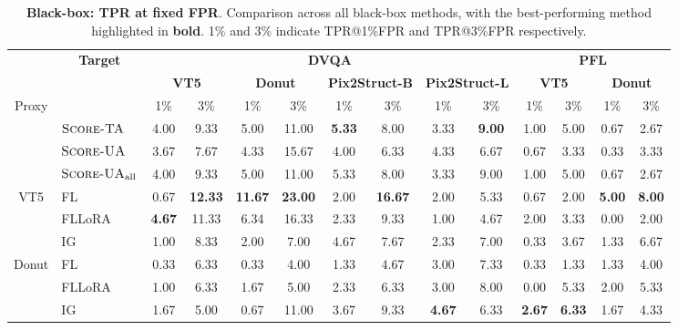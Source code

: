 \begin{table}[t]
\begin{center}
\begin{small}
\begin{adjustbox}{width=1\textwidth}
\small
\begin{tabular}{clcccccccccccc}
\toprule
 & \multicolumn{1}{c}{\multirow{2}{*}{\textbf{Target}}} & \multicolumn{8}{c}{\textbf{DVQA}} & \multicolumn{4}{c}{\textbf{PFL}} \\
\cmidrule(l){3-10}
\cmidrule(l){11-14}
 &  & \multicolumn{2}{c}{\textbf{VT5}} & \multicolumn{2}{c}{\textbf{Donut}} & \multicolumn{2}{c}{\textbf{Pix2Struct-B}} & \multicolumn{2}{c}{\textbf{Pix2Struct-L}} & \multicolumn{2}{c}{\textbf{VT5}} & \multicolumn{2}{c}{\textbf{Donut}} \\
\cmidrule(l){3-4}
\cmidrule(l){5-6}
\cmidrule(l){7-8}
\cmidrule(l){9-10}
\cmidrule(l){11-12}
\cmidrule(l){13-14}
Proxy &  & 1\% & 3\% & 1\% & 3\% & 1\% & 3\% & 1\% & 3\% & 1\% & 3\% & 1\% & 3\%  \\
\midrule
& {$\textsc{Score-TA}$} & 4.00 & 9.33 & 5.00 & 11.00 & \textbf{5.33} & 8.00 & 3.33 & \textbf{9.00} & 1.00 & 5.00 & 0.67 & 2.67 \\
& {$\textsc{Score-UA}$} & 3.67 & 7.67 & 4.33 & 15.67 & 4.00 & 6.33 & 4.33 & 6.67 & 0.67 & 3.33 & 0.33 & 3.33 \\
& {$\textsc{Score-UA}_{\text{all}}$} & 4.00 & 9.33 & 5.00 & 11.00 & 5.33 & 8.00 & 3.33 & 9.00 & 1.00 & 5.00 & 0.67 & 2.67 \\
\midrule
\multirow{3}{*}{VT5} & FL & 0.67 & \textbf{12.33} & \textbf{11.67} & \textbf{23.00} & 2.00 & \textbf{16.67} & 2.00 & 5.33 & 0.67 & 2.00 & \textbf{5.00} & \textbf{8.00} \\
& FLLoRA & \textbf{4.67} & {11.33} & 6.34 & 16.33 & 2.33 & 9.33 & 1.00 & 4.67 & 2.00 & 3.33 & 0.00 & 2.00 \\
& IG & 1.00 & 8.33 & 2.00 & 7.00 & 4.67 & 7.67 & 2.33 & 7.00 & 0.33 & 3.67 & 1.33 & 6.67 \\
\cmidrule(l){1-14}
\multirow{3}{*}{Donut} & FL & 0.33 & 6.33 & 0.33 & 4.00 & 1.33 & 4.67 & 3.00 & 7.33 & 0.33 & 1.33 & 1.33 & 4.00 \\
& FLLoRA & 1.00 & 6.33 & 1.67 & 5.00 & 2.33 & 6.33 & 3.00 & 8.00 & 0.00 & 5.33 & 2.00 & 5.33 \\
& IG & 1.67 & 5.00 & 0.67 & 11.00 & 3.67 & 9.33 & \textbf{4.67} & 6.33 & \textbf{2.67} & \textbf{6.33} & 1.67 & 4.33 \\
\bottomrule
\end{tabular}
\end{adjustbox}
\end{small}
\end{center}
\vskip -0.1in
\caption{\textbf{Black-box: TPR at fixed FPR}. Comparison across all black-box methods, with the best-performing method highlighted in \textbf{bold}. 1\% and 3\% indicate TPR@1\%FPR and TPR@3\%FPR respectively.}
\label{tab:tpr@fpr_blackbox}
\end{table}
